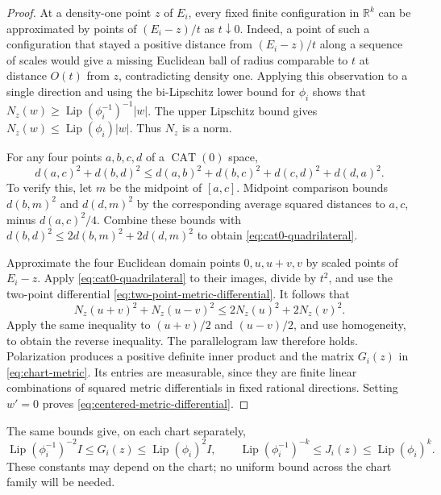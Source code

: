 \documentclass[11pt]{article}
\numberwithin{equation}{section}
\theoremstyle{definition}
\theoremstyle{remark}
\newcommand{\R}{\mathbb R}
\newcommand{\Lip}{\operatorname{Lip}}
\begin{document}
\begin{proof}
At a density-one point \(z\) of \(E_i\), every fixed finite configuration
in \(\R^k\) can be approximated by points of \((E_i-z)/t\) as
\(t\downarrow0\). Indeed, a point of such a configuration that stayed
a positive distance from \((E_i-z)/t\) along a sequence of scales would
give a missing Euclidean ball of radius comparable to \(t\) at distance
\(O(t)\) from \(z\), contradicting density one. Applying this observation
to a single direction and using the bi-Lipschitz lower bound for
\(\phi_i\) shows that \(N_z(w)\ge\Lip(\phi_i^{-1})^{-1}|w|\).
The upper Lipschitz bound gives \(N_z(w)\le\Lip(\phi_i)|w|\).
Thus \(N_z\) is a norm.

For any four points \(a,b,c,d\) of a \(\operatorname{CAT}(0)\) space,
\begin{equation}
\label{eq:cat0-quadrilateral}
 d(a,c)^2+d(b,d)^2
 \le d(a,b)^2+d(b,c)^2+d(c,d)^2+d(d,a)^2.
\end{equation}
To verify this, let \(m\) be the midpoint of \([a,c]\). Midpoint
comparison bounds \(d(b,m)^2\) and \(d(d,m)^2\) by the corresponding
average squared distances to \(a,c\), minus \(d(a,c)^2/4\).
Combine these bounds with
\(d(b,d)^2\le2d(b,m)^2+2d(d,m)^2\) to obtain
\eqref{eq:cat0-quadrilateral}.

Approximate the four Euclidean domain points \(0,u,u+v,v\) by scaled
points of \(E_i-z\). Apply \eqref{eq:cat0-quadrilateral} to their images,
divide by \(t^2\), and use the two-point differential
\eqref{eq:two-point-metric-differential}. It follows that
\[
 N_z(u+v)^2+N_z(u-v)^2\le2N_z(u)^2+2N_z(v)^2.
\]
Apply the same inequality to \((u+v)/2\) and \((u-v)/2\), and use
homogeneity, to obtain the reverse inequality. The parallelogram law
therefore holds. Polarization produces a positive definite inner product
and the matrix \(G_i(z)\) in \eqref{eq:chart-metric}. Its entries are
measurable, since they are finite linear combinations of squared metric
differentials in fixed rational directions. Setting \(w'=0\) proves
\eqref{eq:centered-metric-differential}.
\end{proof}

The same bounds give, on each chart separately,
\begin{equation}
\label{eq:chart-metric-bounds}
 \Lip(\phi_i^{-1})^{-2}I\le G_i(z)\le\Lip(\phi_i)^2I,
 \qquad
 \Lip(\phi_i^{-1})^{-k}\le J_i(z)\le\Lip(\phi_i)^k.
\end{equation}
These constants may depend on the chart; no uniform bound across the
chart family will be needed.
\end{document}
